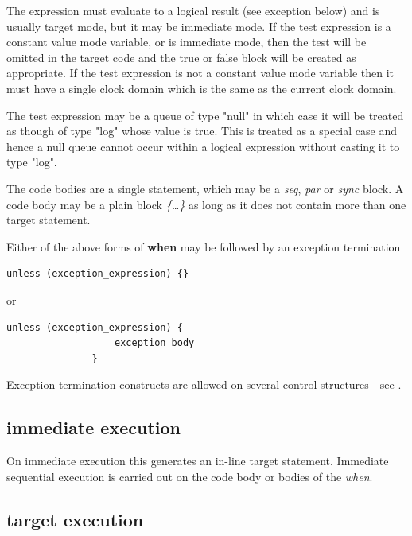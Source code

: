         The expression must evaluate to a logical result (see exception below)
        and is usually target mode, but it may be immediate mode. If the test
        expression is a constant value mode variable, or is immediate mode, then
        the test will be omitted in the target code and the true or false block
        will be created as appropriate. If the test expression is not a constant
        value mode variable then it must have a single clock domain which is the
        same as the current clock domain.
        
        The test expression may be a queue of type "null" in which case it will
        be treated as though of type "log" whose value is true. This is treated
        as a special case and hence a null queue cannot occur within a logical
        expression without casting it to type "log".
        
        The code bodies are a single statement, which may be a {\em seq},
        {\em par} or {\em sync} block. A code body may be a plain block
        {\em \{\dots\}} as long as it does not contain more than one target
        statement.
        
        Either of the above forms of {\bf when} may be followed by an
        exception termination
        \begin{lstlisting}[gobble=8, language=threepl]
               unless (exception_expression) {}
        \end{lstlisting}
        or
        \begin{lstlisting}[gobble=8, language=threepl]
               unless (exception_expression) {
                   exception_body
               }
        \end{lstlisting}
        
        Exception termination constructs are allowed on several control structures
        - see .
        
        \subsection{immediate execution}
        
            On immediate execution this generates an in-line target statement.
            Immediate sequential execution is carried out on the code body or
            bodies of the {\em when}.
        
        \subsection{target execution}

